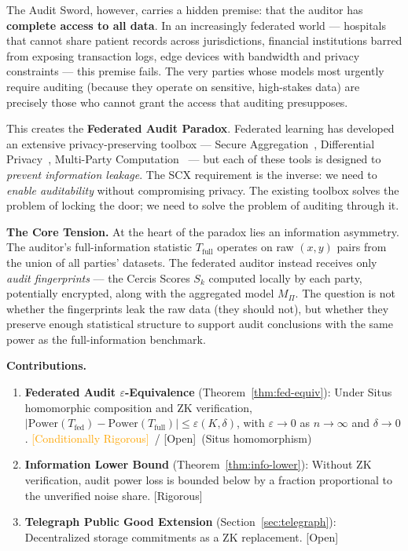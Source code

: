 \documentclass[12pt,a4paper]{article}
\newcommand{\rigorous}{\textcolor{green!50!black}{\small\textsf{[Rigorous]}}}
\newcommand{\conditionallyrigorous}{\textcolor{orange}{\small\textsf{[Conditionally Rigorous]}}}
\newcommand{\openquest}{\textcolor{red!70!black}{\small\textsf{[Open]}}}
\newcommand{\ZK}{\mathrm{ZK}}
\begin{document}
The Audit Sword, however, carries a hidden premise: that the auditor has
\textbf{complete access to all data}.  In an increasingly federated world —
hospitals that cannot share patient records across jurisdictions, financial
institutions barred from exposing transaction logs, edge devices with
bandwidth and privacy constraints — this premise fails.  The very parties
whose models most urgently require auditing (because they operate on
sensitive, high-stakes data) are precisely those who cannot grant the access
that auditing presupposes.

This creates the \textbf{Federated Audit Paradox}.  Federated learning has
developed an extensive privacy-preserving toolbox — Secure
Aggregation~\citep{bonawitz2017practical}, Differential
Privacy~\citep{abadi2016deep}, Multi-Party
Computation~\citep{evans2018pragmatic} — but each of these tools is designed
to \emph{prevent information leakage}.  The SCX requirement is the inverse:
we need to \emph{enable auditability} without compromising privacy.  The
existing toolbox solves the problem of locking the door; we need to solve
the problem of auditing through it.

\medskip\noindent
\textbf{The Core Tension.}
At the heart of the paradox lies an information asymmetry.  The auditor's
full-information statistic $T_{\mathrm{full}}$ operates on raw $(x, y)$ pairs
from the union of all parties' datasets.  The federated auditor instead
receives only \emph{audit fingerprints} — the Cercis Scores $S_k$ computed
locally by each party, potentially encrypted, along with the aggregated model
$M_\Pi$.  The question is not whether the fingerprints leak the raw data (they
should not), but whether they preserve enough statistical structure to support
audit conclusions with the same power as the full-information benchmark.

\medskip\noindent
\textbf{Contributions.}
\begin{enumerate}[label=(\arabic*)]
    \item \textbf{Federated Audit $\varepsilon$-Equivalence}
          (Theorem~\ref{thm:fed-equiv}): Under Situs homomorphic composition
          and $\ZK$ verification, $|\mathrm{Power}(T_{\mathrm{fed}}) -
          \mathrm{Power}(T_{\mathrm{full}})| \leq \varepsilon(K, \delta)$,
          with $\varepsilon \to 0$ as $n \to \infty$ and $\delta \to 0$.
          \conditionallyrigorous~/ \openquest~(Situs homomorphism)
    \item \textbf{Information Lower Bound}
          (Theorem~\ref{thm:info-lower}): Without $\ZK$ verification, audit
          power loss is bounded below by a fraction proportional to the
          unverified noise share.  \rigorous
    \item \textbf{Telegraph Public Good Extension}
          (Section~\ref{sec:telegraph}): Decentralized storage commitments
          as a $\ZK$ replacement.  \openquest
\end{enumerate}
\end{document}
